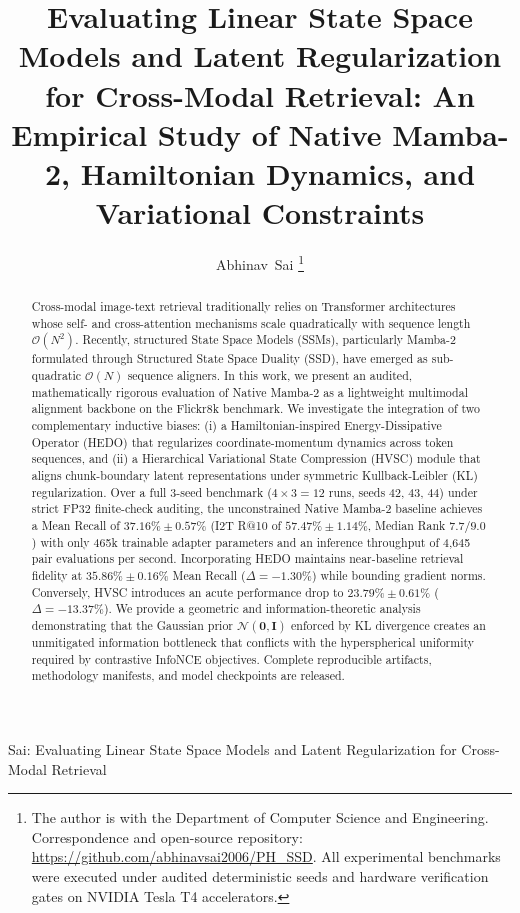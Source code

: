 \documentclass[journal]{IEEEtran}
\begin{document}
\title{Evaluating Linear State Space Models and Latent Regularization for Cross-Modal Retrieval: An Empirical Study of Native Mamba-2, Hamiltonian Dynamics, and Variational Constraints}

\author{Abhinav~Sai%
\thanks{The author is with the Department of Computer Science and Engineering. Correspondence and open-source repository: \protect\url{https://github.com/abhinavsai2006/PH_SSD}. All experimental benchmarks were executed under audited deterministic seeds and hardware verification gates on NVIDIA Tesla T4 accelerators.}%
}

%
{Sai: Evaluating Linear State Space Models and Latent Regularization for Cross-Modal Retrieval}

\maketitle

\begin{abstract}
Cross-modal image-text retrieval traditionally relies on Transformer architectures whose self- and cross-attention mechanisms scale quadratically with sequence length $\mathcal{O}(N^2)$. Recently, structured State Space Models (SSMs), particularly Mamba-2 formulated through Structured State Space Duality (SSD), have emerged as sub-quadratic $\mathcal{O}(N)$ sequence aligners. In this work, we present an audited, mathematically rigorous evaluation of Native Mamba-2 as a lightweight multimodal alignment backbone on the Flickr8k benchmark. We investigate the integration of two complementary inductive biases: (i) a Hamiltonian-inspired Energy-Dissipative Operator (HEDO) that regularizes coordinate-momentum dynamics across token sequences, and (ii) a Hierarchical Variational State Compression (HVSC) module that aligns chunk-boundary latent representations under symmetric Kullback-Leibler (KL) regularization. Over a full 3-seed benchmark ($4 \times 3 = 12$ runs, seeds 42, 43, 44) under strict FP32 finite-check auditing, the unconstrained Native Mamba-2 baseline achieves a Mean Recall of $37.16\% \pm 0.57\%$ (I2T R@10 of $57.47\% \pm 1.14\%$, Median Rank $7.7 / 9.0$) with only 465k trainable adapter parameters and an inference throughput of 4,645 pair evaluations per second. Incorporating HEDO maintains near-baseline retrieval fidelity at $35.86\% \pm 0.16\%$ Mean Recall ($\Delta = -1.30\%$) while bounding gradient norms. Conversely, HVSC introduces an acute performance drop to $23.79\% \pm 0.61\%$ ($\Delta = -13.37\%$). We provide a geometric and information-theoretic analysis demonstrating that the Gaussian prior $\mathcal{N}(\mathbf{0}, \mathbf{I})$ enforced by KL divergence creates an unmitigated information bottleneck that conflicts with the hyperspherical uniformity required by contrastive InfoNCE objectives. Complete reproducible artifacts, methodology manifests, and model checkpoints are released.
\end{abstract}
\end{document}
